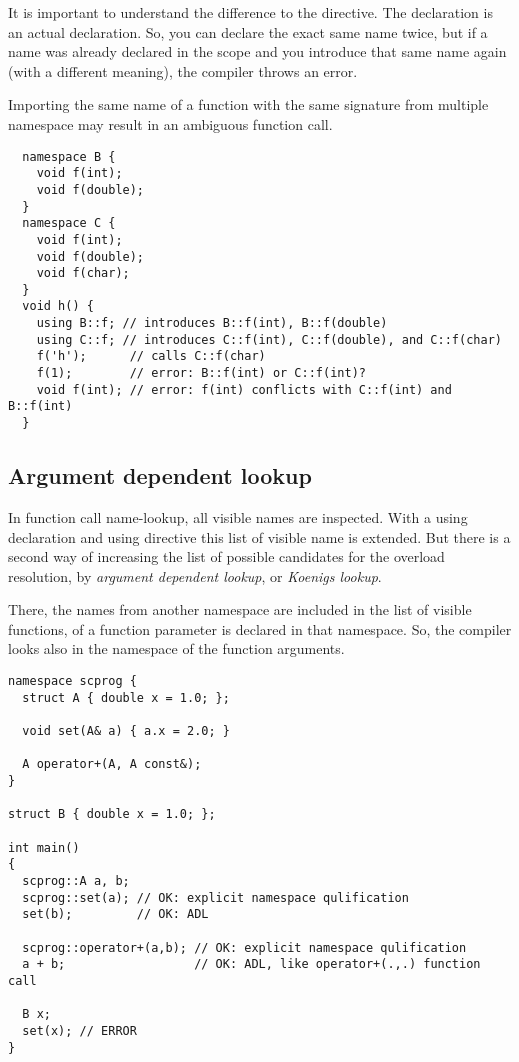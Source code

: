 It is important to understand the difference to the  directive. The  declaration is an actual declaration. So, you can
declare the exact same name twice, but if a name was already declared in the scope and you introduce that same name again (with a different meaning),
the compiler throws an error.

Importing the same name of a function with the same signature from multiple namespace may result in an ambiguous function call.
\begin{verbatim}
  namespace B {
    void f(int);
    void f(double);
  }
  namespace C {
    void f(int);
    void f(double);
    void f(char);
  }
  void h() {
    using B::f; // introduces B::f(int), B::f(double)
    using C::f; // introduces C::f(int), C::f(double), and C::f(char)
    f('h');      // calls C::f(char)
    f(1);        // error: B::f(int) or C::f(int)?
    void f(int); // error: f(int) conflicts with C::f(int) and B::f(int)
  }
\end{verbatim}

\subsection{Argument dependent lookup\label{sec:adl}}
In function call name-lookup, all visible names are inspected. With a using declaration and using directive this list of visible name is extended. But
there is a second way of increasing the list of possible candidates for the overload resolution, by \emph{argument dependent lookup}, or \emph{Koenigs lookup}.

There, the names from another namespace are included in the list of visible functions, of a function parameter is declared in that namespace. So, the
compiler looks also in the namespace of the function arguments.
%
\begin{verbatim}
namespace scprog {
  struct A { double x = 1.0; };

  void set(A& a) { a.x = 2.0; }

  A operator+(A, A const&);
}

struct B { double x = 1.0; };

int main()
{
  scprog::A a, b;
  scprog::set(a); // OK: explicit namespace qulification
  set(b);         // OK: ADL

  scprog::operator+(a,b); // OK: explicit namespace qulification
  a + b;                  // OK: ADL, like operator+(.,.) function call

  B x;
  set(x); // ERROR
}
\end{verbatim}

